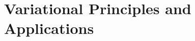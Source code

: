 \documentclass[envcountsect]{SNmono}
\begin{document}



\part{Variational Principles and Applications}
\label{part:variational}
\label{part:quantum}    %





\appendix







\backmatter




\printindex
\end{document}
